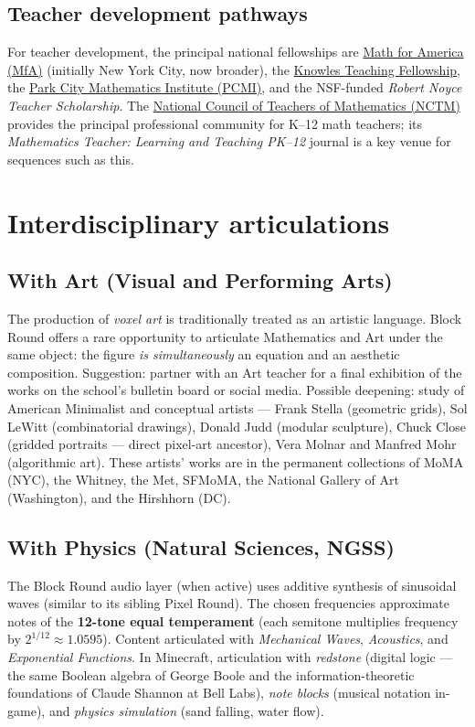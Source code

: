 \documentclass[12pt,a4paper]{scrartcl}
\newcommand{\acc}[1]{\textcolor{accent}{\textbf{#1}}}
\begin{document}
\subsection{Teacher development pathways}

For teacher development, the principal national fellowships are \href{https://www.mathforamerica.org/}{Math for America (MfA)} (initially New York City, now broader), the \href{https://knowles.org/}{Knowles Teaching Fellowship}, the \href{https://www.parkcitymath.org/}{Park City Mathematics Institute (PCMI)}, and the NSF-funded \emph{Robert Noyce Teacher Scholarship}. The \href{https://www.nctm.org/}{National Council of Teachers of Mathematics (NCTM)} provides the principal professional community for K--12 math teachers; its \emph{Mathematics Teacher: Learning and Teaching PK--12} journal is a key venue for sequences such as this.

\section{Interdisciplinary articulations}\label{sec:interdisc}

\subsection{With Art (Visual and Performing Arts)}
The production of \emph{voxel art} is traditionally treated as an artistic language. Block Round offers a rare opportunity to articulate Mathematics and Art under the same object: the figure \emph{is simultaneously} an equation and an aesthetic composition. Suggestion: partner with an Art teacher for a final exhibition of the works on the school's bulletin board or social media. Possible deepening: study of American Minimalist and conceptual artists --- Frank Stella (geometric grids), Sol LeWitt (combinatorial drawings), Donald Judd (modular sculpture), Chuck Close (gridded portraits --- direct pixel-art ancestor), Vera Molnar and Manfred Mohr (algorithmic art). These artists' works are in the permanent collections of MoMA (NYC), the Whitney, the Met, SFMoMA, the National Gallery of Art (Washington), and the Hirshhorn (DC).

\subsection{With Physics (Natural Sciences, NGSS)}
The Block Round audio layer (when active) uses additive synthesis of sinusoidal waves (similar to its sibling Pixel Round). The chosen frequencies approximate notes of the \acc{12-tone equal temperament} (each semitone multiplies frequency by $2^{1/12} \approx 1.0595$). Content articulated with \emph{Mechanical Waves}, \emph{Acoustics}, and \emph{Exponential Functions}. In Minecraft, articulation with \emph{redstone} (digital logic --- the same Boolean algebra of George Boole and the information-theoretic foundations of Claude Shannon at Bell Labs), \emph{note blocks} (musical notation in-game), and \emph{physics simulation} (sand falling, water flow).
\end{document}
